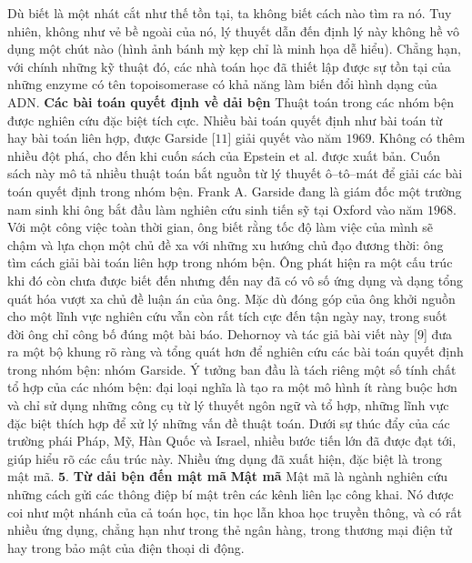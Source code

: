 \begin{multicols}{2}
	\vskip 0.1cm
	Dù biết là một nhát cắt như thế tồn tại, ta không biết cách nào tìm ra nó. Tuy nhiên, không như vẻ bề ngoài của nó, lý thuyết dẫn đến định lý này không hề vô dụng một chút nào (hình ảnh bánh mỳ kẹp chỉ là minh họa dễ hiểu). Chẳng hạn, với chính những kỹ thuật đó, các nhà toán học đã thiết lập được sự tồn tại của những enzyme có tên topoisomerase có khả năng làm biến đổi hình dạng của ADN.
	\vskip 0.1cm
	\textbf{\color{duongvaotoanhoc}Các bài toán quyết định về dải bện}
	\vskip 0.1cm
	Thuật toán trong các nhóm bện được nghiên cứu đặc biệt tích cực. Nhiều bài toán quyết định như bài toán từ hay bài toán liên hợp, được Garside [$11$] giải quyết vào năm $1969$. Không có thêm nhiều đột phá, cho đến khi cuốn sách của Epstein et al. được xuất bản. Cuốn sách này mô tả nhiều thuật toán bắt nguồn từ lý thuyết ô--tô--mát để giải các bài toán quyết định trong nhóm bện.
	\vskip 0.1cm
	Frank A. Garside đang là giám đốc một trường nam sinh khi ông bắt đầu làm nghiên cứu sinh tiến sỹ tại Oxford vào năm $1968$. Với một công việc toàn thời gian, ông biết rằng tốc độ làm việc của mình sẽ chậm và lựa chọn một chủ đề xa với những xu hướng chủ đạo đương thời: ông tìm cách giải bài toán liên hợp trong nhóm bện. Ông phát hiện ra một cấu trúc khi đó còn chưa được biết đến nhưng đến nay đã có vô số ứng dụng và dạng tổng quát hóa vượt xa chủ đề luận án của ông. Mặc dù đóng góp của ông khởi nguồn cho một lĩnh vực nghiên cứu vẫn còn rất tích cực đến tận ngày nay, trong suốt đời ông chỉ công bố đúng một bài báo.
	\vskip 0.1cm
	Dehornoy và tác giả bài viết này [$9$] đưa ra một bộ khung rõ ràng và tổng quát hơn để nghiên cứu các bài toán quyết định trong nhóm bện: nhóm Garside. Ý tưởng ban đầu là tách riêng một số tính chất tổ hợp của các nhóm bện: đại loại nghĩa là tạo ra một mô hình ít ràng buộc hơn và chỉ sử dụng những công cụ từ lý thuyết ngôn ngữ và tổ hợp, những lĩnh vực đặc biệt thích hợp để xử lý những vấn đề thuật toán. Dưới sự thúc đẩy của các trường phái Pháp, Mỹ, Hàn Quốc và Israel, nhiều bước tiến lớn đã được đạt tới, giúp hiểu rõ các cấu trúc này. Nhiều ứng dụng đã xuất hiện, đặc biệt là trong mật mã.
	\vskip 0.1cm
	$\pmb{5.}$ \textbf{\color{duongvaotoanhoc}Từ dải bện đến mật mã}
	\vskip 0.1cm
	\textbf{\color{duongvaotoanhoc}Mật mã}
	\vskip 0.1cm
	Mật mã là ngành nghiên cứu những cách gửi các thông điệp bí mật trên các kênh liên lạc công khai. Nó được coi như một nhánh của cả toán học, tin học lẫn khoa học truyền thông, và có rất nhiều ứng dụng, chẳng hạn như trong thẻ ngân hàng, trong thương mại điện tử hay trong bảo mật của điện thoại di động.
	\begin{figure}[H]

\end{figure}
\end{multicols}
